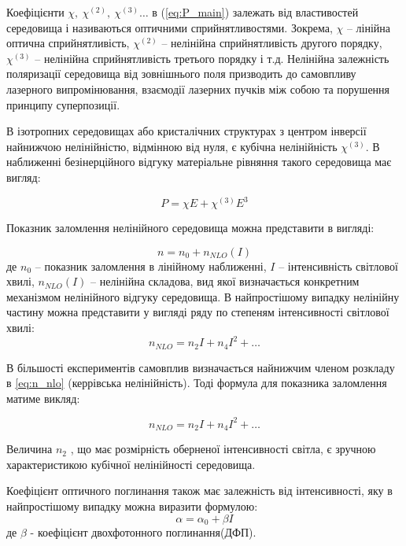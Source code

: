 Коефіцієнти $\chi,~\chi^{(2)},~\chi^{(3)}\dots$ в (\ref{eq:P_main}) залежать від властивостей середовища і називаються оптичними сприйнятливостями. Зокрема, $\chi$ -- лінійна оптична сприйнятливість, $\chi^{(2)}$ -- нелінійна сприйнятливість другого порядку, $\chi^{(3)}$ -- нелінійна сприйнятливість третього порядку і т.д. Нелінійна залежність поляризації середовища від зовнішнього поля призводить до самовпливу лазерного випромінювання, взаємодії лазерних пучків між собою та порушення принципу суперпозиції. 

В ізотропних середовищах або кристалічних структурах з центром інверсії найнижчою нелінійністю, відмінною від нуля, є кубічна нелінійність $\chi^{(3)}$. В наближенні безінерційного відгуку матеріальне рівняння такого середовища має вигляд:

\begin{equation}\label{eq:P}
P=\chi E+ \chi^{(3)}E^3
\end{equation}

Показник заломлення нелінійного середовища можна представити в вигляді:

\begin{equation}
n = n_0 + n_{NLO}(I)
\end{equation}
де $n_0$ -- показник заломлення в лінійному наближенні, $I$ -- інтенсивність світлової хвилі, $n_{NLO}(I)$ -- нелінійна складова, вид якої визначається конкретним механізмом нелінійного відгуку середовища. В найпростішому випадку нелінійну частину
можна представити у вигляді ряду по степеням інтенсивності світлової хвилі:
\begin{equation}\label{eq:n_nlo}
n_{NLO} = n_2 I + n_4 I^2 + \dots
\end{equation}

В більшості експериментів самовплив визначається найнижчим членом
розкладу в \ref{eq:n_nlo} (керрівська нелінійність). Тоді формула для показника заломлення матиме викляд: 

\begin{equation}\label{eq:n_n2}
n_{NLO} = n_2 I + n_4 I^2 + \dots
\end{equation}

Величина $n_2$ , що має розмірність оберненої інтенсивності світла, є зручною характеристикою кубічної нелінійності середовища.

Коефіцієнт оптичного поглинання також має залежність від інтенсивності, яку в найпростішому випадку можна виразити формулою:
\begin{equation}\label{eq:alpha}
\alpha = \alpha_0 + \beta I
\end{equation}
де $\beta$ - коефіцієнт двохфотонного поглинання(ДФП).

